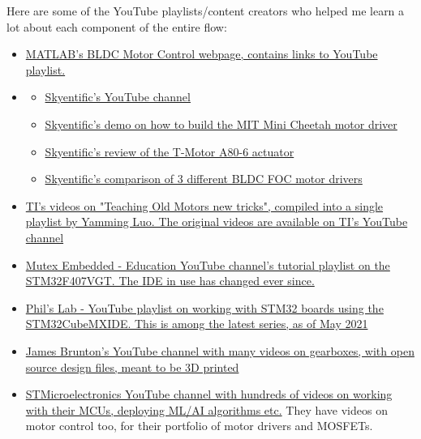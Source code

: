\documentclass[a4paper]{article}
\begin{document}
		Here are some of the YouTube playlists/content creators who helped me learn a lot about each component of the entire flow:
		\begin{itemize}
			\item \href{https://in.mathworks.com/solutions/power-electronics-control/bldc-motor-control.html}{MATLAB's BLDC Motor Control webpage, contains links to YouTube playlist.}
			\item \begin{itemize}
				\item \href{https://www.youtube.com/c/Skyentific/videos}{Skyentific's YouTube channel}
				\item \href{https://www.youtube.com/watch?v=WKRLlthr9kY}{Skyentific's demo on how to build the MIT Mini Cheetah motor driver}
				\item \href{https://www.youtube.com/watch?v=HzY9vzgPZkA}{Skyentific's review of the T-Motor A80-6 actuator}
				\item \href{https://www.youtube.com/watch?v=Wb1gsJ4K4pM}{Skyentific's comparison of 3 different BLDC FOC motor drivers}
			\end{itemize}
			\item \href{https://www.youtube.com/playlist?list=PLQFVvDcd2teniWVcMVeDBWkRVxNjirC6K}{TI's videos on "Teaching Old Motors new tricks", compiled into a single playlist by Yamming Luo. The original videos are available on TI's YouTube channel}
			\item \href {https://www.youtube.com/watch?v=uJvPwxa5n00&list=PLfExI9i0v1sn_lQjCFJHrDSpvZ8F2CpkA}{Mutex Embedded - Education YouTube channel's tutorial playlist on the STM32F407VGT. The IDE in use has changed ever since.}
			\item \href{https://www.youtube.com/playlist?list=PLXSyc11qLa1a4Tqbz228dPZfMrs-KRpzA}{Phil's Lab - YouTube playlist on working with STM32 boards using the STM32CubeMXIDE. This is among the latest series, as of May 2021}
			\item \href{https://www.youtube.com/c/jamesbruton/videos}{James Brunton's YouTube channel with many videos on gearboxes, with open source design files, meant to be 3D printed}
			\item \href{https://www.youtube.com/c/stmicroelectronics/playlists}{STMicroelectronics YouTube channel with hundreds of videos on working with their MCUs, deploying ML/AI algorithms etc.} They have videos on motor control too, for their portfolio of motor drivers and MOSFETs.
		\end{itemize}
\end{document}
